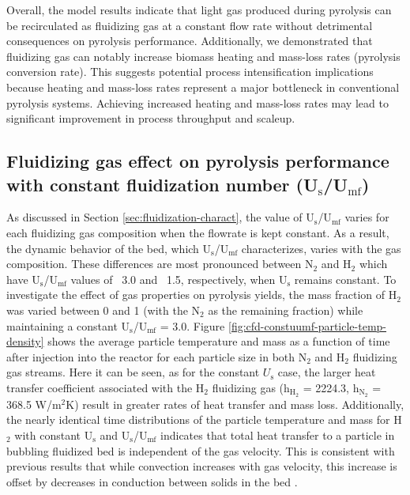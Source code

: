 Overall, the model results indicate that light gas produced during pyrolysis can be recirculated as fluidizing gas at a constant flow rate without detrimental consequences on pyrolysis performance. Additionally, we demonstrated that fluidizing gas can notably increase biomass heating and mass-loss rates (pyrolysis conversion rate). This suggests potential process intensification implications because heating and mass-loss rates represent a major bottleneck in conventional pyrolysis systems. Achieving increased heating and mass-loss rates may lead to significant improvement in process throughput and scaleup.

\subsection{Fluidizing gas effect on pyrolysis performance with constant fluidization number (\texorpdfstring{U$_\text{s}$/U$_\text{mf}$}{Us/Umf})}

As discussed in Section \ref{sec:fluidization-charact}, the value of U$_\text{s}$/U$_\text{mf}$ varies for each fluidizing gas composition when the flowrate is kept constant. As a result, the dynamic behavior of the bed, which U$_\text{s}$/U$_\text{mf}$ characterizes, varies with the gas composition. These differences are most pronounced between N$_2$ and H$_2$ which have U$_\text{s}$/U$_\text{mf}$ values of ~3.0 and ~1.5, respectively, when U$_\text{s}$ remains constant. To investigate the effect of gas properties on pyrolysis yields, the mass fraction of H$_2$ was varied between 0 and 1 (with the N$_2$ as the remaining fraction) while maintaining a constant U$_\text{s}$/U$_\text{mf}$ = 3.0. Figure \ref{fig:cfd-constuumf-particle-temp-density} shows the average particle temperature and mass as a function of time after injection into the reactor for each particle size in both N$_{2}$ and H$_{2}$ fluidizing gas streams. Here it can be seen, as for the constant $U_\text{s}$ case, the larger heat transfer coefficient associated with the H$_2$ fluidizing gas (h$_{\text{H}_2}$ = 2224.3, h$_{\text{N}_2}$ = 368.5 W/m$^2$K) result in greater rates of heat transfer and mass loss. Additionally, the nearly identical time distributions of the particle temperature and mass for H$_2$ with constant U$_\text{s}$ and U$_\text{s}$/U$_\text{mf}$ indicates that total heat transfer to a particle in bubbling fluidized bed is independent of the gas velocity. This is consistent with previous results that while convection increases with gas velocity, this increase is offset by decreases in conduction between solids in the bed \cite{Collier-2004,zhou2009particle}.

